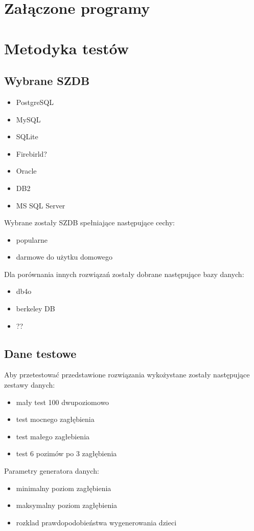 \documentclass[10pt,a4paper,oneside]{book}
\begin{document}
\chapter{Załączone programy}

\chapter{Metodyka testów}
\section{Wybrane SZDB}
\begin{itemize}
 \item PostgreSQL
 \item MySQL
 \item SQLite
 \item Firebirld?
 \item Oracle
 \item DB2
 \item MS SQL Server
\end{itemize}


Wybrane zostały SZDB spełniające następujące cechy:
\begin{itemize}
 \item popularne
 \item darmowe do użytku domowego 
\end{itemize}


Dla porównania innych rozwiązań zostały dobrane następujące bazy danych:

\begin{itemize}
 \item db4o
 \item berkeley DB
 \item ??
\end{itemize}

\section{Dane testowe}

Aby przetestować przedstawione rozwiązania wykożystane zostały następujące zestawy danych:
\begin{itemize}
 \item mały test 100 dwupoziomowo
 \item test mocnego zagłębienia
 \item test małego zagłebienia
 \item test 6 pozimów po 3 zagłębienia 
\end{itemize}


Parametry generatora danych:
\begin{itemize}
 \item minimalny poziom zagłębienia
 \item maksymalny poziom zagłębienia
 \item rozklad prawdopodobieństwa wygenerowania dzieci
\end{itemize}
\end{document}
